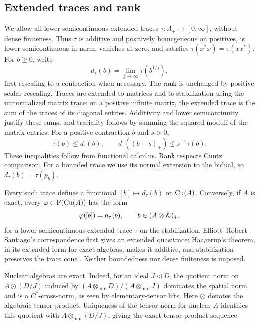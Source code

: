 \subsection{Extended traces and rank}

We allow all lower semicontinuous extended traces
\(\tau:A_+\to[0,\infty]\), without dense finiteness. Thus \(\tau\) is
additive and positively homogeneous on positives, is lower
semicontinuous in norm, vanishes at zero, and satisfies
\(\tau(x^*x)=\tau(xx^*)\). For \(b\ge0\), write
\[
 d_\tau(b)=\lim_{j\to\infty}\tau(b^{1/j}),
\]
first rescaling to a contraction when necessary. The rank is unchanged
by positive scalar rescaling. Traces
are extended to matrices and to stabilization using the unnormalized
matrix trace: on a positive infinite matrix, the extended trace is the
sum of the traces of its diagonal entries. Additivity and lower
semicontinuity justify these sums, and traciality follows by summing the
squared moduli of the matrix entries.
For a positive contraction \(b\) and \(s>0\),
\begin{equation}
\label{eq:pre:trace-rank}
 \tau(b)\le d_\tau(b),\qquad
 d_\tau((b-s)_+)\le s^{-1}\tau(b).
\end{equation}
These inequalities follow from functional calculus. Rank respects
Cuntz comparison. For a bounded trace we use its normal extension
to the bidual, so \(d_\tau(b)=\tau(p_b)\).

Every such trace defines a functional $[b]\mapsto d_\tau(b)$ on
$\mathrm{Cu}(A)$. Conversely, if $A$ is exact, every
$\varphi\in\mathrm F(\mathrm{Cu}(A))$ has the form
\begin{equation}
\label{ext:eq:trace-representation}
 \varphi([b])=d_\tau(b),\qquad b\in(A\otimes\mathcal K)_+,
\end{equation}
for a lower semicontinuous extended trace $\tau$ on the stabilization.
Elliott--Robert--Santiago's correspondence first gives an extended
quasitrace; Haagerup's theorem, in its extended form for exact algebras,
makes it additive, and stabilization preserves the trace cone
\cite[Proposition~4.2 and Remarks~4.3 and~4.5]{ERS2011}.
Neither boundedness nor dense finiteness is imposed.

Nuclear algebras are exact. Indeed, for an ideal $J\lhd D$, the quotient
norm on $A\odot(D/J)$ induced by
$(A\otimes_{\min}D)/(A\otimes_{\min}J)$ dominates the spatial norm and
is a $C^*$-cross-norm, as seen by elementary-tensor lifts. Here $\odot$
denotes the algebraic tensor product. Uniqueness of the tensor norm for
nuclear $A$ identifies this quotient with $A\otimes_{\min}(D/J)$,
giving the exact tensor-product sequence.

